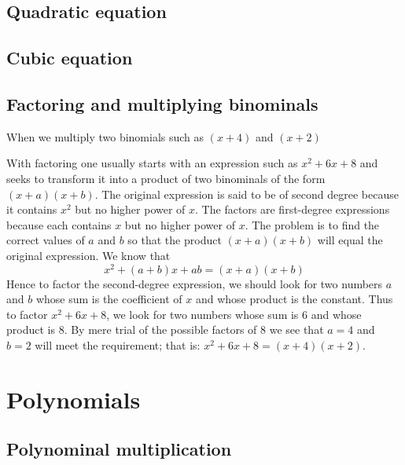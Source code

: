
\subsection{Quadratic equation}

\subsection{Cubic equation}


\subsection{Factoring and multiplying binominals}
When we multiply two binomials such as $(x+4)$ and $(x+2)$

With factoring one usually starts with an expression such as $x^2 + 6 x + 8$ and seeks to transform it into a product of two binominals of the form $(x + a)(x + b)$. The original expression is said to be of second degree because it contains $x^2$ but no higher power of $x$. The factors are first-degree expressions because each contains $x$ but  no higher power of $x$. The problem is to find the correct values of $a$ and $b$ so that the product $(x + a)(x + b)$ will equal the original
expression. We know that
\begin{equation}\label{alg:binom_factor}
x^2 + (a + b)x + ab = (x + a)(x + b)
\end{equation}
Hence to factor the second-degree expression, we should look for two numbers $a$ and $b$ whose sum is the coefficient of $x$ and whose product is the constant. Thus to factor $x^2 + 6 x + 8$, we look for two numbers whose sum is $6$ and whose product is $8$. By mere trial of the possible factors of $8$ we see that $a = 4$ and $b = 2$ will meet the requirement; that is: $x^2 + 6 x + 8 = (x + 4)(x + 2)$.


\section{Polynomials}

\subsection{Polynominal multiplication}

